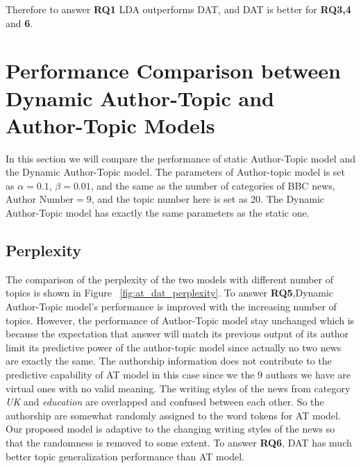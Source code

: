 Therefore to answer \textbf{RQ1} LDA outperforms DAT, and DAT is better for \textbf{RQ3,4} and \textbf{6}.


\section{Performance Comparison between Dynamic Author-Topic and Author-Topic Models}

In this section we will compare the performance of static Author-Topic model and the Dynamic Author-Topic model. The parameters of Author-topic model is set as $\alpha = 0.1$, $\beta = 0.01$, and the same as the number of categories of BBC news, $\text{Author Number} = 9$, and the topic number here is set as 20. The Dynamic Author-Topic model has exactly the same parameters as the static one.

\subsection{Perplexity}
The comparison of the perplexity of the two models with different number of topics is shown in Figure ~\ref{fig:at_dat_perplexity}. To answer \textbf{RQ5},Dynamic Author-Topic model's performance is improved with the increasing number of topics. However, the performance of Author-Topic model stay unchanged which is because the expectation that answer will match its previous output of its author limit its predictive power of the author-topic model since actually no two news are exactly the same. The authorship information does not contribute to the predictive capability of AT model in this case since we the 9 authors we have are virtual ones with no valid meaning. The writing styles of the news from category \textit{UK} and \textit{education} are overlapped and confused between each other. So the authorship are somewhat randomly assigned to the word tokens for AT model. Our proposed model is adaptive to the changing writing styles of the news so that the randomness is removed to some extent. To answer \textbf{RQ6}, DAT has much better topic generalization performance than AT model.

